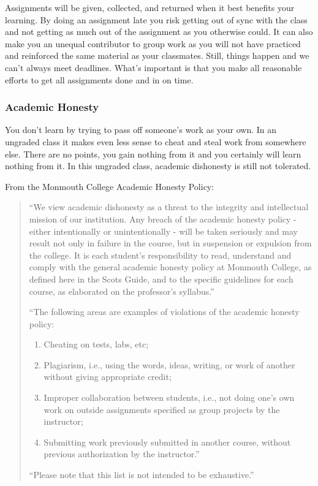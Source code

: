 \documentclass[10pt]{article}
\begin{document}
Assignments will be given, collected, and returned when it best benefits your learning. By doing an assignment late you risk getting out of sync with the class and not getting as much out of the assignment as you otherwise could. It can also make you an unequal contributor to group work as you will not have practiced and reinforced the same material as your classmates. Still, things happen and we can't always meet deadlines.  What's important is that you make all reasonable efforts to get all assignments done and in on time.


\subsubsection*{Academic Honesty}

You don't learn by trying to pass off someone's work as your own. In an ungraded class it makes even less sense to cheat and steal work from somewhere else.  There are no points, you gain nothing from it and you certainly will learn nothing from it. In this ungraded class, academic dishonesty is still not tolerated.

From the Monmouth College Academic Honesty Policy:
\begin{quote}
  ``We view academic dishonesty as a threat to the integrity and intellectual mission of our institution. Any breach of the academic honesty policy - either intentionally or unintentionally - will be taken seriously and may result not only in failure in the course, but in suspension or expulsion from the college. It is each student’s responsibility to read, understand and comply with the general academic honesty policy at Monmouth College, as defined here in the Scots Guide, and to the specific guidelines for each course, as elaborated on the professor’s syllabus.''

  ``The following areas are examples of violations of the academic honesty policy:
  \begin{enumerate}
  \item Cheating on tests, labs, etc;
  \item Plagiarism, i.e., using the words, ideas, writing, or work of another without giving appropriate credit;
  \item Improper collaboration between students, i.e., not doing one’s own work on outside assignments specified as group projects by the instructor;
  \item Submitting work previously submitted in another course, without previous authorization by the instructor.''
  \end{enumerate}

  ``Please note that this list is not intended to be exhaustive.''
\end{quote}
\end{document}
